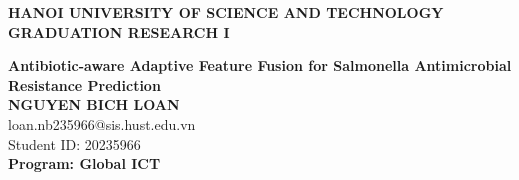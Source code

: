 \documentclass[DoAn.tex]{subfiles}
\begin{document}
\begin{titlepage}
\thispagestyle{empty}
\begin{center}

{\textbf{\large{HANOI UNIVERSITY OF SCIENCE AND TECHNOLOGY}}}\\[4cm]

{\textbf{\huge{GRADUATION RESEARCH I}}}\\[1cm]
{\textbf{\Large{Antibiotic-aware Adaptive Feature Fusion for Salmonella Antimicrobial Resistance Prediction}}\\[1cm]

{\textbf{\large{NGUYEN BICH LOAN}}}\\
{\large{loan.nb235966@sis.hust.edu.vn}}\\
{\large{Student ID: 20235966}}\\[0.5cm]

{\textbf{\large{Program: Global ICT
}}}\\

\vspace{4cm}
\begin{table}[H]
\centering
{}
\end{table}}
\end{center}



\end{titlepage}
\end{document}
